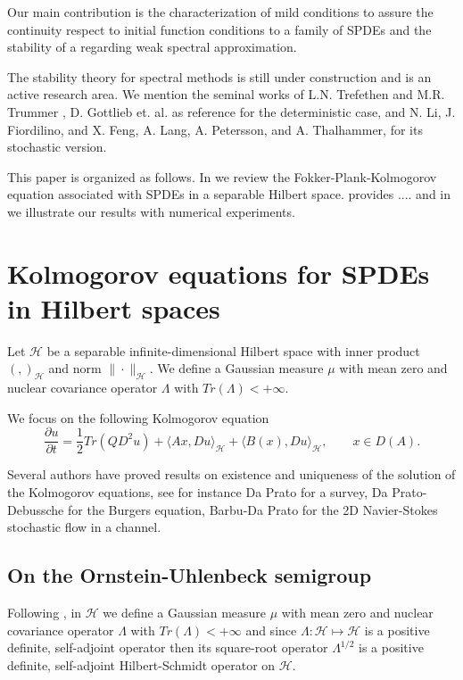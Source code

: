\documentclass[review, onefignum, onetabnum]{siamart171218}
\begin{document}
    Our main contribution is the characterization of mild conditions to
assure the continuity respect to initial function conditions to a family of
SPDEs and the stability of a regarding weak spectral approximation.

    The stability theory for spectral methods is still under 
construction and is an active research area. We mention the seminal works of
L.N. Trefethen and M.R. Trummer \cite{Trefethen1987}, D. Gottlieb et. al.
\cite{Gottlieb1987a} as reference for the deterministic case, and N. Li, J.
Fiordilino, and X. Feng, \cite{Li2019} A. Lang, A. Petersson,  and A.
Thalhammer, \cite{Lang2017} for its stochastic version.


    This paper is organized as follows. In  we review the
Fokker-Plank-Kolmogorov equation associated with SPDEs in
a separable Hilbert space.  
provides .... and in  we illustrate our
results with numerical experiments.

\section{Kolmogorov equations for SPDEs in Hilbert spaces}\label{fpk-sect}
    Let $\mathcal{H}$ be a separable infinite-dimensional Hilbert space with
inner product $( ,  )_\mathcal{H} $ and norm $\|\cdot\|_\mathcal{H}$. We define
a Gaussian measure $\mu$ with mean zero and nuclear covariance operator
$\Lambda$ with  $Tr(\Lambda)<+\infty$.

    We focus on the following Kolmogorov equation
\begin{equation}
    \label{P1s2.3}
    \frac{\partial u}{\partial t}= \frac{1}{2}Tr(QD^2u)+ \langle Ax, Du
    \rangle_\mathcal{H} + \langle B(x),Du \rangle_\mathcal{H},\qquad x\in D(A).
\end{equation}

    Several authors have proved results on existence and uniqueness of the
solution of the Kolmogorov equations, see for instance Da Prato \cite{da} for a
survey, Da Prato-Debussche \cite{da-de} for the Burgers equation,  Barbu-Da
Prato \cite{ba-da} for the 2D Navier-Stokes stochastic flow in a channel.
%
\subsection{On the Ornstein-Uhlenbeck semigroup}\label{OUS-sect}
    Following \cite{liu},  in $\mathcal{H}$ we define a Gaussian measure $\mu$
with mean zero and nuclear covariance operator $\Lambda$ with
${Tr(\Lambda)<+\infty}$ and since $\Lambda:\mathcal{H}\mapsto \mathcal{H}$ is a
positive definite, self-adjoint operator then its square-root operator
$\Lambda^{1/2}$ is a positive definite, self-adjoint Hilbert-Schmidt operator
on $\mathcal{H}$.
\end{document}
